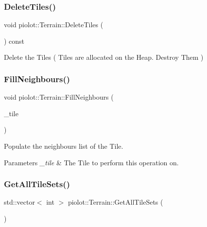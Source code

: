\subsubsection{\texorpdfstring{Delete\+Tiles()}{DeleteTiles()}}
{\footnotesize\ttfamily void piolot\+::\+Terrain\+::\+Delete\+Tiles (\begin{DoxyParamCaption}{ }\end{DoxyParamCaption}) const}



Delete the Tiles ( Tiles are allocated on the Heap. Destroy Them ) 

\mbox{\label{classpiolot_1_1_terrain_ae61a150d060f54eb14ef465541cc6214}} 
\subsubsection{\texorpdfstring{Fill\+Neighbours()}{FillNeighbours()}}
{\footnotesize\ttfamily void piolot\+::\+Terrain\+::\+Fill\+Neighbours (\begin{DoxyParamCaption}\item[{\mbox{\hyperlink{classpiolot_1_1_map_tile}{Map\+Tile}} \&}]{\+\_\+tile }\end{DoxyParamCaption})}



Populate the neighbours list of the Tile. 


\begin{DoxyParams}{Parameters}
{\em \+\_\+tile} & The Tile to perform this operation on. \\
\hline
\end{DoxyParams}
\mbox{\label{classpiolot_1_1_terrain_a1008afdeef49245b34551141ad40e512}} 
\subsubsection{\texorpdfstring{Get\+All\+Tile\+Sets()}{GetAllTileSets()}}
{\footnotesize\ttfamily std\+::vector$<$ int $>$ piolot\+::\+Terrain\+::\+Get\+All\+Tile\+Sets (\begin{DoxyParamCaption}{ }\end{DoxyParamCaption})}



